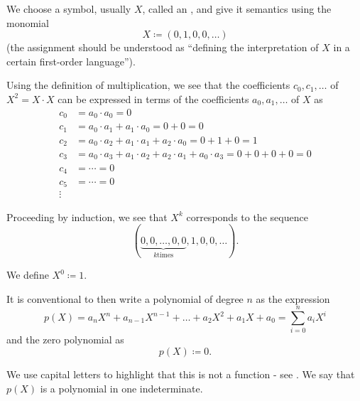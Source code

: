 \begin{remark}\label{remark:polynomial_symbolic_expression}
  We choose a symbol, usually \( X \), called an , and give it semantics using the monomial
  \begin{equation*}
    X \coloneqq (0, 1, 0, 0, \ldots)
  \end{equation*}
  (the assignment should be understood as \enquote{defining the interpretation of \( X \) in a certain first-order language}).

  Using the definition of multiplication, we see that the coefficients \( c_0, c_1, \ldots \) of \( X^2 = X \cdot X \) can be expressed in terms of the coefficients \( a_0, a_1, \ldots \) of \( X \) as
  \begin{align*}
    c_0 &= a_0 \cdot a_0 = 0 \\
    c_1 &= a_0 \cdot a_1 + a_1 \cdot a_0 = 0 + 0 = 0 \\
    c_2 &= a_0 \cdot a_2 + a_1 \cdot a_1 + a_2 \cdot a_0 = 0 + 1 + 0 = 1 \\
    c_3 &= a_0 \cdot a_3 + a_1 \cdot a_2 + a_2 \cdot a_1 + a_0 \cdot a_3 = 0 + 0 + 0 + 0 = 0 \\
    c_4 &= \cdots = 0 \\
    c_5 &= \cdots = 0 \\
    \vdots
  \end{align*}

  Proceeding by induction, we see that \( X^k \) corresponds to the sequence
  \begin{equation*}
    (\underbrace{0, 0, \ldots, 0, 0}_{k \text{times}}, 1, 0, 0, \ldots).
  \end{equation*}

  We define \( X^0 \coloneqq 1 \).

  It is conventional to then write a polynomial of degree \( n \) as the expression
  \begin{equation*}
    p(X) = a_n X^n + a_{n-1} X^{n-1} + \ldots + a_2 X^2 + a_1 X + a_0 = \sum_{i=0}^n a_i X^i
  \end{equation*}
  and the zero polynomial as
  \begin{equation*}
    p(X) \coloneqq 0.
  \end{equation*}

  We use capital letters to highlight that this is not a function - see . We say that \( p(X) \) is a polynomial in one indeterminate.
\end{remark}


